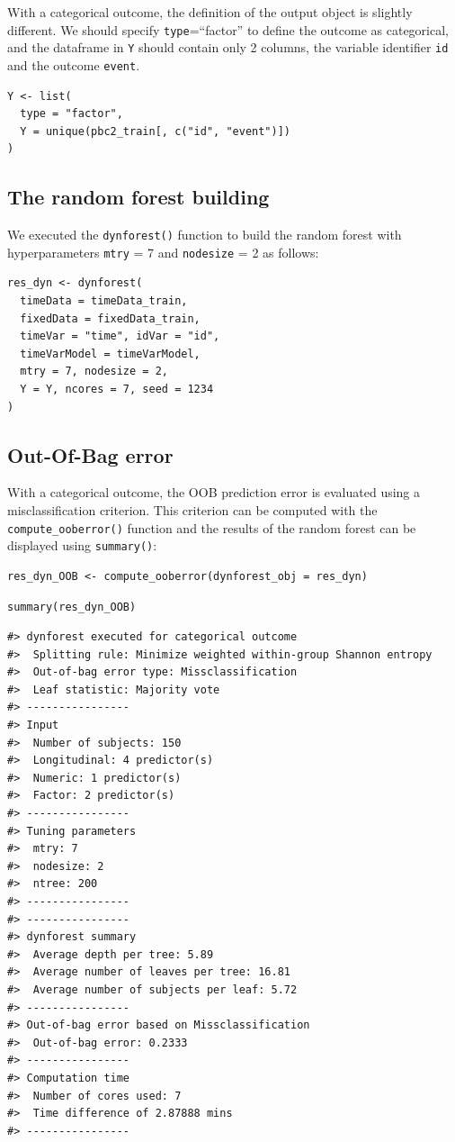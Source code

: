 With a categorical outcome, the definition of the output object is slightly different. We should specify \texttt{type}=``factor'' to define the outcome as categorical, and the dataframe in \texttt{Y} should contain only 2 columns, the variable identifier \texttt{id} and the outcome \texttt{event}.

\begin{verbatim}
Y <- list(
  type = "factor",
  Y = unique(pbc2_train[, c("id", "event")])
)
\end{verbatim}

\subsection{The random forest building}\label{the-random-forest-building}

We executed the \texttt{dynforest()} function to build the random forest with hyperparameters \texttt{mtry} = 7 and \texttt{nodesize} = 2 as follows:

\begin{verbatim}
res_dyn <- dynforest(
  timeData = timeData_train,
  fixedData = fixedData_train,
  timeVar = "time", idVar = "id",
  timeVarModel = timeVarModel,
  mtry = 7, nodesize = 2,
  Y = Y, ncores = 7, seed = 1234
)
\end{verbatim}

\subsection{Out-Of-Bag error}\label{out-of-bag-error-1}

With a categorical outcome, the OOB prediction error is evaluated using a misclassification criterion. This criterion can be computed with the \texttt{compute\_ooberror()} function and the results of the random forest can be displayed using \texttt{summary()}:

\begin{verbatim}
res_dyn_OOB <- compute_ooberror(dynforest_obj = res_dyn)
\end{verbatim}

\begin{verbatim}
summary(res_dyn_OOB)
\end{verbatim}

\begin{verbatim}
#> dynforest executed for categorical outcome
#>  Splitting rule: Minimize weighted within-group Shannon entropy
#>  Out-of-bag error type: Missclassification
#>  Leaf statistic: Majority vote
#> ----------------
#> Input
#>  Number of subjects: 150
#>  Longitudinal: 4 predictor(s)
#>  Numeric: 1 predictor(s)
#>  Factor: 2 predictor(s)
#> ----------------
#> Tuning parameters
#>  mtry: 7
#>  nodesize: 2
#>  ntree: 200
#> ----------------
#> ----------------
#> dynforest summary
#>  Average depth per tree: 5.89
#>  Average number of leaves per tree: 16.81
#>  Average number of subjects per leaf: 5.72
#> ----------------
#> Out-of-bag error based on Missclassification
#>  Out-of-bag error: 0.2333
#> ----------------
#> Computation time
#>  Number of cores used: 7
#>  Time difference of 2.87888 mins
#> ----------------
\end{verbatim}

